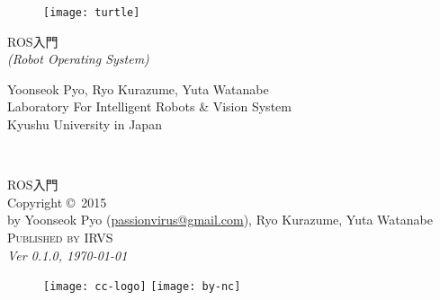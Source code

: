 \documentclass[11pt,fleqn]{book} %
\begin{document}

\begingroup
\thispagestyle{empty}
\centering
\vspace*{3cm}
\begin{figure}[h]
\centering\hspace{30pt}\texttt{[image: turtle]}
\end{figure}
\vspace*{1cm}
\par\normalfont\fontsize{50}{50}\sffamily\selectfont
ROS入門\\%
{\Huge \textit{(Robot Operating System)}}\par
\vspace*{6cm}
{\large Yoonseok Pyo, Ryo Kurazume, Yuta Watanabe}\\
{\large Laboratory For Intelligent Robots \& Vision System\\Kyushu University in Japan}\par
\endgroup


\newpage
~\vfill
\thispagestyle{empty}

\noindent ROS入門\\

\noindent Copyright \copyright\ 2015\\by Yoonseok Pyo (\href{mailto:passionvirus@gmail.com}{passionvirus@gmail.com}), Ryo Kurazume, Yuta Watanabe\\ %

\noindent \textsc{Published by IRVS}\\ %

\noindent \textit{Ver 0.1.0, \today}\\ %



\begin{figure}[h]
\centering
\texttt{[image: cc-logo]}
\hspace{10pt}
\texttt{[image: by-nc]}
\end{figure}
\end{document}
